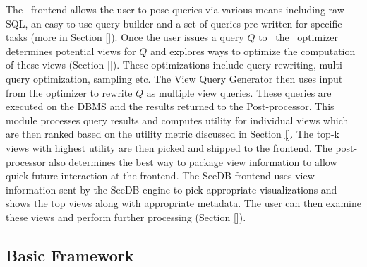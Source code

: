 The \SeeDB\ frontend allows the user to pose queries via various means including
raw SQL, an easy-to-use query builder and a set of queries pre-written for
specific tasks (more in Section \ref{}). Once the user issues a query $Q$ to
\SeeDB\, the \SeeDB\ optimizer determines potential views for $Q$ and explores
ways to optimize the computation of these views (Section \ref{}). These
optimizations include query rewriting, multi-query optimization, sampling etc.
The View Query Generator then uses input from the optimizer to rewrite $Q$ as
multiple view queries. These queries are executed on the DBMS and the results
returned to the Post-processor. This module processes query results and computes
utility for individual views which are then ranked based on the utility metric
discussed in Section \ref{}. The top-k views with highest utility are then
picked and shipped to the frontend. The post-processor also determines the best
way to package view information to allow quick future interaction at the
frontend. The SeeDB frontend uses view information sent by the SeeDB engine to
pick appropriate visualizations and shows the top views along with appropriate
metadata. The user can then examine these views and perform further processing
(Section \ref{}).

\subsection{Basic Framework}
\label{basic_framework}

